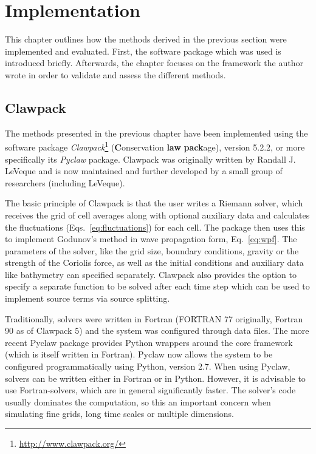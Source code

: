 \chapter{Implementation}
\label{ch:implementation}

This chapter outlines how the methods derived in the previous section were implemented and evaluated. First, the software package which was used is introduced briefly. Afterwards, the chapter focuses on the framework the author wrote in order to validate and assess the different methods.

\section{Clawpack}

The methods presented in the previous chapter have been implemented using the software package \emph{Clawpack}\footnote{\url{http://www.clawpack.org/}} (\textbf{C}onservation \textbf{law} \textbf{pack}age), version 5.2.2, or more specifically its \emph{Pyclaw} package. Clawpack was originally written by Randall J. LeVeque and is now maintained and further developed by a small group of researchers (including LeVeque).

The basic principle of Clawpack is that the user writes a Riemann solver, which receives the grid of cell averages along with optional auxiliary data and calculates the fluctuations (Eqs.~\ref{eq:fluctuations}) for each cell. The package then uses this to implement Godunov's method in wave propagation form, Eq.~\ref{eq:wpf}. The parameters of the solver, like the grid size, boundary conditions, gravity or the strength of the Coriolis force, as well as the initial conditions and auxiliary data like bathymetry can specified separately. Clawpack also provides the option to specify a separate function to be solved after each time step which can be used to implement source terms via source splitting.

Traditionally, solvers were written in Fortran (FORTRAN 77 originally, Fortran 90 as of Clawpack 5) and the system was configured through data files. The more recent Pyclaw package provides Python wrappers around the core framework (which is itself written in Fortran). Pyclaw now allows the system to be configured programmatically using Python, version 2.7. When using Pyclaw, solvers can be written either in Fortran or in Python. However, it is advisable to use Fortran-solvers, which are in general significantly faster. The solver's code usually dominates the computation, so this an important concern when simulating fine grids, long time scales or multiple dimensions.

